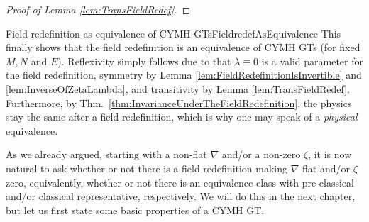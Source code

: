 \begin{proof}[Proof of Lemma \ref{lem:TransFieldRedef}]
\end{proof}

\begin{remarks}{Field redefinition as equivalence of CYMH GTs}{FieldredefAsEquivalence}
This finally shows that the field redefinition is an equivalence of CYMH GTs (for fixed $M, N$ and $E$). Reflexivity simply follows due to that $\lambda \equiv 0$ is a valid parameter for the field redefinition, symmetry by Lemma \ref{lem:FieldRedefinitionIsInvertible} and \ref{lem:InverseOfZetaLambda}, and transitivity by Lemma \ref{lem:TransFieldRedef}. Furthermore, by Thm.~\ref{thm:InvarianceUnderTheFieldRedefinition}, the physics stay the same after a field redefinition, which is why one may speak of a \emph{physical} equivalence.
\end{remarks}

As we already argued, starting with a non-flat $\nabla$ and/or a non-zero $\zeta$, it is now natural to ask whether or not there is a field redefinition making $\nabla$ flat and/or $\zeta$ zero, equivalently, whether or not there is an equivalence class with pre-classical and/or classical representative, respectively. We will do this in the next chapter, but let us first state some basic properties of a CYMH GT.

